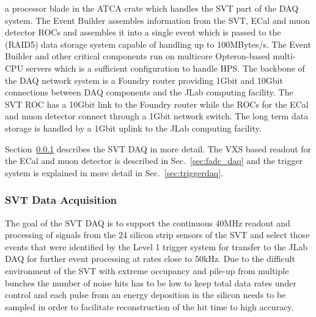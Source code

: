 a processor blade in the ATCA crate which handles the SVT part of the DAQ system. 
The Event Builder assembles 
information from the SVT, ECal and muon detector ROCs and assembles it into a single 
event which is passed to the (RAID5) data storage system capable of handling up to 
100MBytes/s. The Event Builder and other 
critical components run on multicore Opteron-based multi-CPU servers which is a 
sufficient configuration to handle HPS. The backbone of the DAQ network system is a 
Foundry router providing 1Gbit and 10Gbit connections between DAQ components and 
the JLab computing facility. The SVT ROC has a 10Gbit link to the Foundry router while the 
ROCs for the ECal and muon detector connect through a 1Gbit network switch. The long 
term data storage is handled by a 1Gbit uplink to the JLab computing facility. 

Section~\ref{sec:svt_daq} describes the SVT DAQ in more detail. The VXS based readout for 
the ECal and muon detector is described in Sec.~\ref{sec:fadc_daq} and the trigger 
system is explained in more detail in Sec.~\ref{sec:triggerdaq}.

\subsubsection{SVT Data Acquisition}
\label{sec:svt_daq}
The goal of the SVT DAQ is to support the continuous 40MHz readout and processing of signals from 
the 24 silicon strip sensors of the SVT and select those events that were identified by the 
Level 1 trigger system for transfer to the JLab DAQ for further event processing at rates 
close to 50kHz. 
Due to the difficult environment of the SVT with extreme occupancy and pile-up from multiple bunches  the number of noise hits has to be low to keep total data rates under control and 
each pulse from an energy deposition in the silicon needs to be sampled in order to facilitate 
reconstruction of the hit time to high accuracy. 

